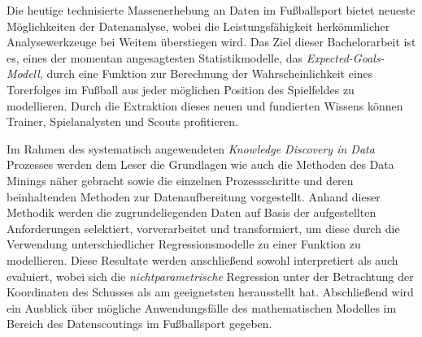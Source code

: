%
%
\seKurzfassung{} %


Die heutige technisierte Massenerhebung an Daten im Fußballsport bietet neueste Möglichkeiten der Datenanalyse, wobei die Leistungsfähigkeit herkömmlicher Analysewerkzeuge bei Weitem überstiegen wird. Das Ziel dieser Bachelorarbeit ist es, eines der momentan angesagtesten Statistikmodelle, das \textit{Expected-Goals-Modell}, durch eine Funktion zur Berechnung der Wahrscheinlichkeit eines Torerfolges im Fußball aus jeder möglichen Position des Spielfeldes zu modellieren. Durch die Extraktion dieses neuen und fundierten Wissens können Trainer, Spielanalysten und Scouts profitieren.

Im Rahmen des systematisch angewendeten \textit{Knowledge Discovery in Data} Prozesses werden dem Leser die Grundlagen wie auch die Methoden des Data Minings näher gebracht sowie die einzelnen Prozessschritte und deren beinhaltenden Methoden zur Datenaufbereitung vorgestellt. Anhand dieser Methodik werden die zugrundeliegenden Daten auf Basis der aufgestellten Anforderungen selektiert, vorverarbeitet und transformiert, um diese durch die Verwendung unterschiedlicher Regressionsmodelle zu einer Funktion zu modellieren. Diese Resultate werden anschließend sowohl interpretiert als auch evaluiert, wobei sich die \textit{nichtparametrische} Regression unter der Betrachtung der Koordinaten des Schusses als am geeignetsten herausstellt hat. Abschließend wird ein Ausblick über mögliche Anwendungsfälle des mathematischen Modelles im Bereich des Datenscoutings im Fußballsport gegeben.